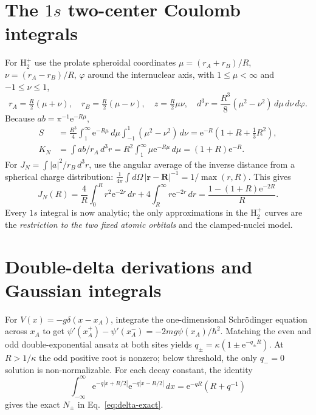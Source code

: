 \documentclass[11pt,letterpaper]{article}
\newcommand{\e}{\mathrm e}
\begin{document}
\clearpage
\appendix
\section{The $1s$ two-center Coulomb integrals}\label{app:1s}
For $\mathrm H_2^+$ use the prolate spheroidal coordinates $\mu=(r_A+r_B)/R$, $\nu=(r_A-r_B)/R$, $\varphi$ around the internuclear axis, with $1\le\mu<\infty$ and $-1\le\nu\le1$,
\begin{equation}\label{eq:prolate}
r_A=\tfrac R2(\mu+\nu),\quad r_B=\tfrac R2(\mu-\nu),\quad
z=\tfrac R2\mu\nu,\quad d^3r=\frac{R^3}{8}(\mu^2-\nu^2)\,d\mu\,d\nu\,d\varphi.
\end{equation}
Because $ab=\pi^{-1}\e^{-R\mu}$,
\begin{align}
S&=\frac{R^3}{4}\int_1^\infty\!\e^{-R\mu}\,d\mu\int_{-1}^1\!(\mu^2-\nu^2)\,d\nu
=\e^{-R}\left(1+R+\tfrac13R^2\right),\\
K_N&=\int ab/r_A\,d^3r
=R^2\int_1^\infty\mu\e^{-R\mu}\,d\mu=(1+R)\e^{-R}.
\end{align}
For $J_N=\int |a|^2/r_B\,d^3r$, use the angular average of the inverse distance from a spherical charge distribution: $\frac{1}{4\pi}\int d\Omega\,|\mathbf r-\mathbf R|^{-1}=1/\max(r,R)$. This gives
\begin{equation}
J_N(R)=\frac4R\int_0^R r^2\e^{-2r}\,dr+4\int_R^\infty r\e^{-2r}\,dr
=\frac{1-(1+R)\e^{-2R}}R.
\end{equation}
Every $1s$ integral is now analytic; the only approximations in the $\mathrm H_2^+$ curves are the \emph{restriction to the two fixed atomic orbitals} and the clamped-nuclei model.

\section{Double-delta derivations and Gaussian integrals}\label{app:delta}
For $V(x)=-g\delta(x-x_A)$, integrate the one-dimensional Schr\"odinger equation across $x_A$ to get $\psi'(x_A^+)-\psi'(x_A^-)=-2mg\psi(x_A)/\hbar^2$. Matching the even and odd double-exponential ansatz at both sites yields $q_\pm=\kappa(1\pm\e^{-q_\pm R})$. At $R>1/\kappa$ the odd positive root is nonzero; below threshold, the only $q_-=0$ solution is non-normalizable. For each decay constant, the identity
\begin{equation}
\int_{-\infty}^\infty\e^{-q|x+R/2|}\e^{-q|x-R/2|}\,dx
=\e^{-qR}(R+q^{-1})
\end{equation}
gives the exact $N_\pm$ in Eq.~\eqref{eq:delta-exact}.
\end{document}
